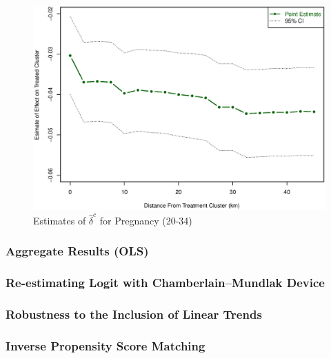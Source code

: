 \documentclass[10pt,letterpaper,subeqn]{beamer}
\begin{document}
\begin{frame}[label=dist2034]
\begin{figure}[htpb!]
\begin{center}
\caption{Estimates of $\hat\delta^c$ for Pregnancy (20-34)}
\label{TEENfig:Dist1519}
\vspace{-5mm}
\includegraphics[scale=0.44]{./../../Figures/Dist2034.eps} 
\end{center}
\end{figure}
\hyperlink{dist1519}{}
\end{frame}

\begin{frame}[label=agg]
\frametitle{Aggregate Results (OLS)}

\hyperlink{robust}{}
\end{frame}

\begin{frame}[label=CM]
\frametitle{Re-estimating Logit with Chamberlain--Mundlak Device}

\hyperlink{robust}{}
\end{frame}

\begin{frame}[label=trends]
\frametitle{Robustness to the Inclusion of Linear Trends}
\hyperlink{robust}{}
\end{frame}

\begin{frame}[label=propensity]
\frametitle{Inverse Propensity Score Matching}
\hyperlink{robust}{}
\end{frame}


\begin{frame}

\end{frame}
\end{document}
